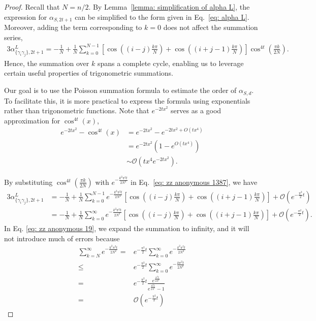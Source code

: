 \documentclass[showpacs,onecolumn,aps,prx,long bibliography,superscriptaddress,notitlepage]{revtex4-1}
\newcommand{\alpl}{\alpha_{\{\gamma_i\gamma_j\}, 2t+1}^{L}}
\begin{document}
\begin{proof}
Recall that $N = n/2$. By Lemma~\ref{lemma: simplification of alpha L}, the expression for $\alpha_{S,2t+1}$ can be simplified to the form given in Eq.~\eqref{eq: alpha L}. Moreover, adding the term corresponding to $k=0$ does not affect the summation series,
\begin{equation}
\label{eq: zz anonymous 1387}
\begin{aligned}
3\alpl 
=-\frac{1}{N}+\frac{1}{N} \sum_{k=0}^{N-1}\left[\cos \left((i-j) \frac{k \pi}{N}\right)+\cos \left((i+j-1) \frac{k \pi}{N}\right)\right] \cos ^{4 t}\left(\frac{\pi k}{2 N}\right).
\end{aligned}
\end{equation}
Hence, the summation over $k$ spans a complete cycle, enabling us to leverage certain useful properties of trigonometric summations.



Our goal is to use the Poisson summation formula to estimate the order of $\alpha_{S,d}$. To facilitate this, it is more practical to express the formula using exponentials rather than trigonometric functions. Note that $e^{-2tx^2}$ serves as a good approximation for $\cos^{4t}(x)$,
\begin{equation}
\begin{aligned}
e^{-2 t x^2}-\cos ^{4 t}(x) & =  e^{-2 t x^2}-e^{-2 t x^2+O\left(t x^4\right)} \\
&=  e^{-2 t x^2}\left(1-e^{O\left(t x^4\right)}\right) \\
&\sim \mathcal{O}\left(t x^4 e^{-2 t x^2}\right).
\end{aligned}
\end{equation}

By substituting $\cos ^{4 t}\left(\frac{\pi k}{2 N}\right)$ with $e^{-\frac{k^2 \pi^2 t}{2N^2}}$ in Eq.~\eqref{eq: zz anonymous 1387}, we have 
\begin{align}
3\alpl& =-\frac{1}{N}+\frac{1}{N} \sum_{k=0}^{N-1} e^{-\frac{k^2 \pi^2 t}{2 N^2}}\left[\cos \left((i-j) \frac{k \pi}{N}\right)+\cos \left((i+j-1) \frac{k \pi}{N}\right)\right]+\mathcal{O}\left(e^{-\frac{\pi^2}{2}t}\right)\\
& =-\frac{1}{N}+\frac{1}{N} \sum_{k=0}^{\infty}e^{-\frac{k^2 \pi^2 t}{2 N^2}}\left[\cos \left((i-j) \frac{k \pi}{N}\right)+\cos \left((i+j-1) \frac{k \pi}{N}\right)\right]+\mathcal{O}\left(e^{-\frac{\pi^2}{2}t}\right).
\label{eq: zz anonymous 19}
\end{align}
In Eq. \eqref{eq: zz anonymous 19}, we expand the summation to infinity, and it will not introduce much of errors because 
\begin{align*}
    \sum_{k=N}^{\infty} e^{-\frac{k^2 \pi^2 t}{2 N^2}} =& e^{-\frac{\pi^2}{2}t}\sum_{k=0}^{\infty} e^{-\frac{k^2 \pi^2 t}{2 N^2}} \\
    \leq& e^{-\frac{\pi^2}{2}t}\sum_{k=0}^{\infty} e^{-\frac{k \pi^2 t}{2 N^2}} \\
    =& e^{-\frac{\pi^2}{2}t} \frac{e^{\frac{\pi^2 t}{2 N^2}}}{e^{\frac{\pi^2 t}{2 N^2}} -1 } \\
    =& \mathcal{O}\left(e^{-\frac{\pi^2}{2}t}\right)
\end{align*}



\end{proof}
\end{document}
